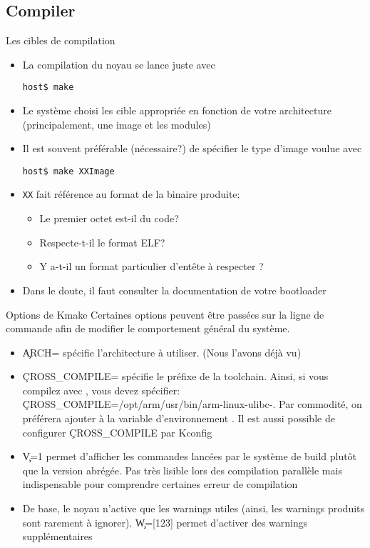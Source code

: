 \subsection{Compiler}
\begin{frame}[fragile=singleslide]{Les cibles de compilation}
  \begin{itemize} 
  \item  La compilation  du noyau  se lance  juste avec 
    \begin{lstlisting} 
host$ make
    \end{lstlisting} 
  \item Le  système choisi les  cible appropriée en fonction  de votre
    architecture (principalement, une image et les modules)
   \item Il est souvent  préférable (nécessaire?) de spécifier le type
     d'image voulue avec
    \begin{lstlisting}
host$ make XXImage
    \end{lstlisting}
  \item \verb+XX+ fait référence au format de la binaire produite:
    \begin{itemize}
    \item Le premier octet est-il du code?
    \item Respecte-t-il le format ELF?
    \item Y a-t-il un format particulier d'entête à respecter ?
    \end{itemize}
  \item Dans  le doute,  il faut consulter  la documentation  de votre
    bootloader
  \end{itemize}
\end{frame} 

\begin{frame}[fragile=singleslide]{Options de Kmake}
  Certaines options peuvent être passées sur la ligne de commande afin
  de modifier le comportement général du système.
  \begin{itemize}
  \item  \c{ARCH=} spécifie l'architecture  à utiliser.  (Nous l'avons
    déjà vu)
  \item \c{CROSS_COMPILE=} spécifie le préfixe de la toolchain. Ainsi,
    si vous  compilez avec ,
    vous                        devez                       spécifier:
    \c{CROSS_COMPILE=/opt/arm/usr/bin/arm-linux-ulibc-}.            Par
    commodité,  on  préférera   ajouter    à  la
    variable  d'environnement  .  Il  est aussi  possible  de
    configurer \c{CROSS_COMPILE} par Kconfig
  \item \c{V=1} permet d'afficher les commandes lancées par le système
    de build plutôt que la  version abrégée. Pas très lisible lors des
    compilation parallèle mais indispensable pour comprendre certaines
    erreur de compilation
  \item De base, le noyau n'active que les warnings utiles (ainsi, les
    warnings  produits sont rarement  à ignorer).   \c{W=[123]} permet
    d'activer des warnings supplémentaires
\end{itemize} 
\end{frame} 

